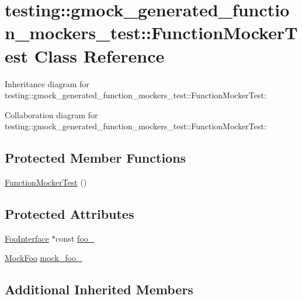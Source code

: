 \hypertarget{classtesting_1_1gmock__generated__function__mockers__test_1_1_function_mocker_test}{}\section{testing\+:\+:gmock\+\_\+generated\+\_\+function\+\_\+mockers\+\_\+test\+:\+:Function\+Mocker\+Test Class Reference}
\label{classtesting_1_1gmock__generated__function__mockers__test_1_1_function_mocker_test}


Inheritance diagram for testing\+:\+:gmock\+\_\+generated\+\_\+function\+\_\+mockers\+\_\+test\+:\+:Function\+Mocker\+Test\+:


Collaboration diagram for testing\+:\+:gmock\+\_\+generated\+\_\+function\+\_\+mockers\+\_\+test\+:\+:Function\+Mocker\+Test\+:
\subsection*{Protected Member Functions}
\begin{DoxyCompactItemize}
\item 
\hyperlink{classtesting_1_1gmock__generated__function__mockers__test_1_1_function_mocker_test_a22216ac0755e96e21c0f76068ff64f03}{Function\+Mocker\+Test} ()
\end{DoxyCompactItemize}
\subsection*{Protected Attributes}
\begin{DoxyCompactItemize}
\item 
\hyperlink{classtesting_1_1gmock__generated__function__mockers__test_1_1_foo_interface}{Foo\+Interface} $\ast$const \hyperlink{classtesting_1_1gmock__generated__function__mockers__test_1_1_function_mocker_test_ae2b8b577c4808f2dff9797168468f65f}{foo\+\_\+}
\item 
\hyperlink{classtesting_1_1gmock__generated__function__mockers__test_1_1_mock_foo}{Mock\+Foo} \hyperlink{classtesting_1_1gmock__generated__function__mockers__test_1_1_function_mocker_test_a265659f07a0e75152ab295add4769585}{mock\+\_\+foo\+\_\+}
\end{DoxyCompactItemize}
\subsection*{Additional Inherited Members}


